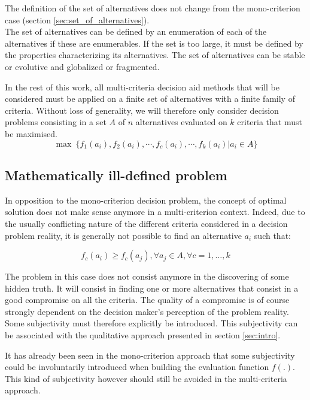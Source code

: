 The definition of the set of alternatives does not change from the mono-criterion case (section \ref{sec:set_of_alternatives}).\\
The set of alternatives can be defined by an enumeration of each of the alternatives if these are enumerables. If the set is too large, it must be defined by the properties characterizing its alternatives.
The set of alternatives can be stable or evolutive and globalized or fragmented.

In the rest of this work, all multi-criteria decision aid methods that will be considered must be applied on a finite set of alternatives with a finite family of criteria. Without loss of generality, we will therefore only consider decision problems consisting in a set $A$ of $n$ alternatives evaluated on $k$ criteria that must be maximised.
\begin{equation}
    \max \  \{f_1(a_i), f_2(a_i), \cdots , f_c(a_i), \cdots , f_k(a_i) | a_i \in A\}
    \label{eq:multicriteria_pb_model_maximisation}
\end{equation}

\subsection{Mathematically ill-defined problem}

In opposition to the mono-criterion decision problem, the concept of optimal solution does not make sense anymore in a multi-criterion context.
Indeed, due to the usually conflicting nature of the different criteria considered in a decision problem reality, it is generally not possible to find an alternative $a_i$ such that:

\begin{equation}
    f_c(a_i) \ge f_c(a_j), \forall a_j \in A, \forall c = 1, \dots,k
    \label{eq:no_optimal_sol_mutlicriterion}
\end{equation}

The problem in this case does not consist anymore in the discovering of some hidden truth. It will consist in finding one or more alternatives that consist in a good compromise on all the criteria.
The quality of a compromise is of course strongly dependent on the decision maker's perception of the problem reality. Some subjectivity must therefore explicitly be introduced. This subjectivity can be associated with the qualitative approach presented in section \ref{sec:intro}.

It has already been seen in the mono-criterion approach that some subjectivity could be involuntarily introduced when building the evaluation function $f(.)$.
This kind of subjectivity however should still be avoided in the multi-criteria approach.

